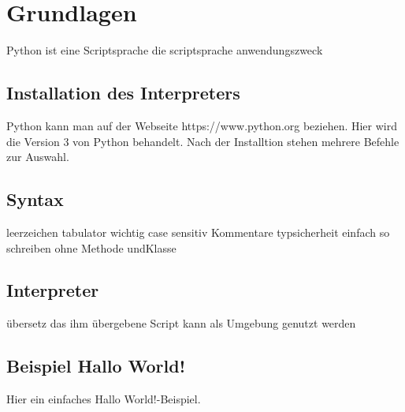 
\section{Grundlagen}
Python ist eine Scriptsprache die 
scriptsprache
anwendungszweck

\subsection{Installation des Interpreters}
Python kann man auf der Webseite https://www.python.org beziehen.
Hier wird die Version 3 von Python behandelt.
Nach der Installtion stehen mehrere Befehle zur Auswahl.
\begin{enumerate}

\end{enumerate}

\subsection{Syntax}
leerzeichen
tabulator wichtig
case sensitiv
Kommentare
typsicherheit
einfach so schreiben ohne Methode undKlasse


\subsection{Interpreter}
übersetz das ihm übergebene Script
kann als Umgebung genutzt werden


\subsection{Beispiel \glqq Hallo World!\grqq}
Hier ein einfaches \glqq Hallo World!\grqq -Beispiel.


